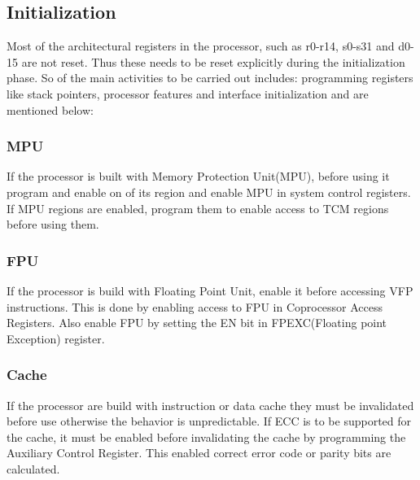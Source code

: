 \subsection{Initialization}
Most of the architectural registers in the processor, such as r0-r14, s0-s31 and d0-15 are not reset. Thus these needs to be reset explicitly during the initialization phase.
So of the main activities to be carried out includes: programming registers like stack pointers, processor features and interface initialization and are mentioned below:
\subsubsection{MPU}
If the processor is built with Memory Protection Unit(MPU), before using it program and enable on of its region and enable MPU in system control registers.
If MPU regions are enabled, program them to enable access to TCM regions before using them.
\subsubsection{FPU}
If the processor is build with Floating Point Unit, enable it before accessing VFP instructions. This is done by enabling access to FPU in Coprocessor Access Registers.
Also enable FPU by setting the EN bit in FPEXC(Floating point Exception) register.
\subsubsection{Cache}
If the processor are build with instruction or data cache they must be invalidated before use otherwise the behavior is unpredictable.
If ECC is to be supported for the cache, it must be enabled before invalidating the cache by programming the Auxiliary Control Register. This enabled correct error code or parity bits are calculated.

